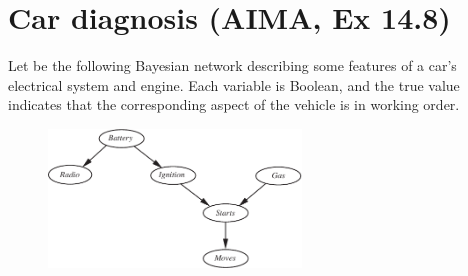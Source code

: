 \documentclass[11pt, a4paper]{article}
\begin{document}
\newpage

\section{Car diagnosis (AIMA, Ex 14.8)}

Let be the following Bayesian network describing some features of a car's electrical system and engine. Each variable is Boolean, and the true value indicates that the corresponding aspect of the vehicle is in working order.

\begin{figure}[h]
    \centering
    \includegraphics[width=0.6\textwidth]{figures/e3_car.pdf}
\end{figure}
\end{document}
